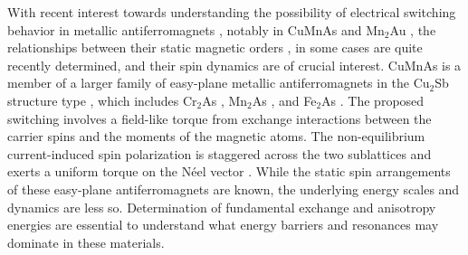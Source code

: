 \documentclass[letterpaper,10pt,doublespacing,edeposit]{uiucthesis2020}
\begin{document}
\begin{mainmatter}
With recent interest towards understanding the possibility of electrical switching behavior in metallic antiferromagnets \cite{Baltz2018,Siddiqui2020,Jungfleisch2018,Zelezny2018}, notably in CuMnAs \cite{Wadley2016,Grzybowski2017,Wadley2018,Matalla-Wagner2019} and Mn$_2$Au \cite{Meinert2018,Bodnar2019}, the relationships between their static magnetic orders \cite{Wadley2013,Hills2015,Wadley2015,Saidl2017}, in some cases are quite recently determined, and their spin dynamics \cite{Grzybowski2017,Bodnar2019,Yang2019,Yang2020} are of crucial interest. CuMnAs is a member of a larger family of easy-plane metallic antiferromagnets in the Cu$_2$Sb structure type \cite{Nateprov2011,Wadley2013}, which includes Cr$_2$As \cite{Yuzuri1960Cr2As}, Mn$_2$As \cite{Yuzuri1960}, and Fe$_2$As \cite{Katsuraki1966}.
The proposed switching involves a field-like torque from exchange interactions between the carrier spins and the moments of the magnetic atoms. The non-equilibrium current-induced spin polarization is staggered across the two sublattices and exerts a uniform torque on the N\'{e}el vector \cite{Zelezny2014,Zelezny2017,Wadley2016}.
While the static spin arrangements of these easy-plane antiferromagnets are known, the underlying energy scales and dynamics are less so. 
Determination of fundamental exchange and anisotropy energies are essential to understand what energy barriers and resonances may dominate in these materials.



\end{mainmatter}
\end{document}
